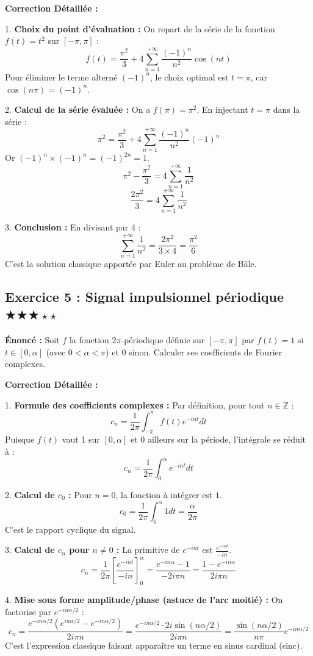 \documentclass[11pt,a4paper]{article}
\begin{document}
\textbf{Correction Détaillée :}

1. \textbf{Choix du point d'évaluation :}
   On repart de la série de la fonction $f(t) = t^2$ sur $[-\pi, \pi]$ :
   $$ f(t) = \frac{\pi^2}{3} + 4 \sum_{n=1}^{+\infty} \frac{(-1)^n}{n^2} \cos(nt) $$
   Pour éliminer le terme alterné $(-1)^n$, le choix optimal est $t = \pi$, car $\cos(n\pi) = (-1)^n$.

2. \textbf{Calcul de la série évaluée :}
   On a $f(\pi) = \pi^2$.
   En injectant $t=\pi$ dans la série :
   $$ \pi^2 = \frac{\pi^2}{3} + 4 \sum_{n=1}^{+\infty} \frac{(-1)^n}{n^2} (-1)^n $$
   Or $(-1)^n \times (-1)^n = (-1)^{2n} = 1$.
   $$ \pi^2 - \frac{\pi^2}{3} = 4 \sum_{n=1}^{+\infty} \frac{1}{n^2} $$
   $$ \frac{2\pi^2}{3} = 4 \sum_{n=1}^{+\infty} \frac{1}{n^2} $$

3. \textbf{Conclusion :}
   En divisant par 4 :
   $$ \sum_{n=1}^{+\infty} \frac{1}{n^2} = \frac{2\pi^2}{3 \times 4} = \frac{\pi^2}{6} $$
   C'est la solution classique apportée par Euler au problème de Bâle.


\subsection*{Exercice 5 : Signal impulsionnel périodique \quad $\bigstar\bigstar\bigstar\star\star$}

\textbf{Énoncé :}
Soit $f$ la fonction $2\pi$-périodique définie sur $[-\pi, \pi]$ par $f(t) = 1$ si $t \in [0, \alpha]$ (avec $0 < \alpha < \pi$) et $0$ sinon. Calculer ses coefficients de Fourier complexes.

\textbf{Correction Détaillée :}

1. \textbf{Formule des coefficients complexes :}
   Par définition, pour tout $n \in \mathbb{Z}$ :
   $$ c_n = \frac{1}{2\pi} \int_{-\pi}^\pi f(t) e^{-int} dt $$
   Puisque $f(t)$ vaut 1 sur $[0, \alpha]$ et 0 ailleurs sur la période, l'intégrale se réduit à :
   $$ c_n = \frac{1}{2\pi} \int_0^\alpha e^{-int} dt $$

2. \textbf{Calcul de $c_0$ :}
   Pour $n = 0$, la fonction à intégrer est $1$.
   $$ c_0 = \frac{1}{2\pi} \int_0^\alpha 1 dt = \frac{\alpha}{2\pi} $$
   C'est le rapport cyclique du signal.

3. \textbf{Calcul de $c_n$ pour $n \neq 0$ :}
   La primitive de $e^{-int}$ est $\frac{e^{-int}}{-in}$.
   $$ c_n = \frac{1}{2\pi} \left[ \frac{e^{-int}}{-in} \right]_0^\alpha = \frac{e^{-in\alpha} - 1}{-2i\pi n} = \frac{1 - e^{-in\alpha}}{2i\pi n} $$

4. \textbf{Mise sous forme amplitude/phase (astuce de l'arc moitié) :}
   On factorise par $e^{-in\alpha/2}$ :
   $$ c_n = \frac{e^{-in\alpha/2} (e^{in\alpha/2} - e^{-in\alpha/2})}{2i\pi n} = \frac{e^{-in\alpha/2} \cdot 2i \sin(n\alpha/2)}{2i\pi n} = \frac{\sin(n\alpha/2)}{n\pi} e^{-in\alpha/2} $$
   C'est l'expression classique faisant apparaître un terme en sinus cardinal (sinc).
\end{document}
